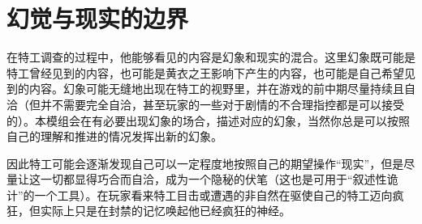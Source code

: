 \section{幻觉与现实的边界}

在特工调查的过程中，他能够看见的内容是幻象和现实的混合。这里幻象既可能是特工曾经见到的内容，也可能是黄衣之王影响下产生的内容，也可能是自己希望见到的内容。幻象可能无缝地出现在特工的视野里，并在游戏的前中期尽量持续且自洽（但并不需要完全自洽，甚至玩家的一些对于剧情的不合理指控都是可以接受的）。本模组会在有必要出现幻象的场合，描述对应的幻象，当然你总是可以按照自己的理解和推进的情况发挥出新的幻象。

因此特工可能会逐渐发现自己可以一定程度地按照自己的期望操作“现实”，但是尽量让这一切都显得巧合而自洽，成为一个隐秘的伏笔（这也是可用于“叙述性诡计”的一个工具）。在玩家看来特工目击或遭遇的非自然在驱使自己的特工迈向疯狂，但实际上只是在封禁的记忆唤起他已经疯狂的神经。